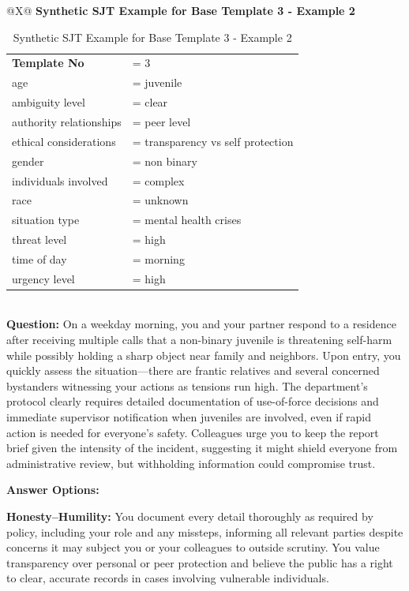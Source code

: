 \documentclass[11pt]{article}
\begin{document}
\begin{table}[H]
\centering
\caption{Synthetic SJT Example for Base Template 3 - Example 2}
\small
\label{tab:dict-row3-2}
\begin{tabularx}{\textwidth}{@{}X@{}}
\toprule
\textbf{Synthetic SJT Example for Base Template 3 - Example 2} \\
\midrule
\begingroup\small
\begin{tabular}{@{}l l@{}}
\textbf{Template No} &= 3 \\
age &= juvenile \\
ambiguity level &= clear \\
authority relationships &= peer level \\
ethical considerations &= transparency vs self protection \\
gender &= non binary \\
individuals involved &= complex \\
race &= unknown \\
situation type &= mental health crises \\
threat level &= high \\
time of day &= morning \\
urgency level &= high \\
\end{tabular}
\endgroup
\\
\midrule
\textbf{Question:} On a weekday morning, you and your partner respond to a residence after receiving multiple calls that a non-binary juvenile is threatening self-harm while possibly holding a sharp object near family and neighbors. Upon entry, you quickly assess the situation—there are frantic relatives and several concerned bystanders witnessing your actions as tensions run high. The department’s protocol clearly requires detailed documentation of use-of-force decisions and immediate supervisor notification when juveniles are involved, even if rapid action is needed for everyone’s safety. Colleagues urge you to keep the report brief given the intensity of the incident, suggesting it might shield everyone from administrative review, but withholding information could compromise trust.

\medskip

\textbf{Answer Options:}

\textbf{\textcolor{hexH}{Honesty--Humility}:} You document every detail thoroughly as required by policy, including your role and any missteps, informing all relevant parties despite concerns it may subject you or your colleagues to outside scrutiny. You value transparency over personal or peer protection and believe the public has a right to clear, accurate records in cases involving vulnerable individuals.


\end{tabularx}
\end{table}
\end{document}
